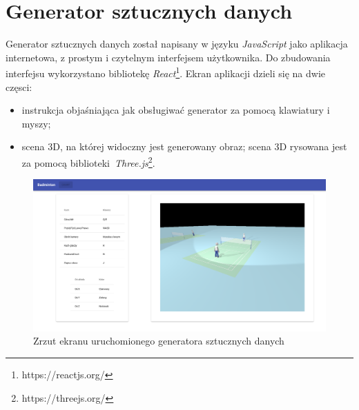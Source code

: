 \newpage
\section{Generator sztucznych danych}

Generator sztucznych danych został napisany w języku \textit{JavaScript} jako aplikacja internetowa, z prostym i czytelnym interfejsem użytkownika.
Do zbudowania interfejsu wykorzystano bibliotekę \textit{React}\footnote{https://reactjs.org/}.
Ekran aplikacji dzieli się na dwie częsci:
\begin{itemize}
  \item instrukcja objaśniająca jak obsługiwać generator za pomocą klawiatury i myszy;
  \item scena 3D, na której widoczny jest generowany obraz; scena 3D rysowana jest za pomocą biblioteki~\textit{Three.js}\footnote{https://threejs.org/}.
\end{itemize}

\begin{figure}[!htb]
  \includegraphics[width=\linewidth]{./generator_1.png}
    \caption{Zrzut ekranu uruchomionego generatora sztucznych danych}
\end{figure}
